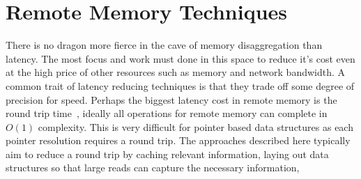 





\section{Remote Memory Techniques}
\label{sec:techniques}

There is no dragon more fierce in the cave of memory disaggregation than
latency. The most focus and work must done in this space to reduce it's cost
even at the high price of other resources such as memory and network bandwidth.
A common trait of latency reducing techniques is that they trade off some degree
of precision for speed. Perhaps the biggest latency cost in remote memory is the
round trip time~\cite{design-far-memory-struct}, ideally all operations for
remote memory can complete in $O(1)$ complexity. This is very difficult for
pointer based data structures as each pointer resolution requires a round trip.
The approaches described here typically aim to reduce a round trip by caching
relevant information, laying out data structures so that large reads can capture
the necessary information, 


